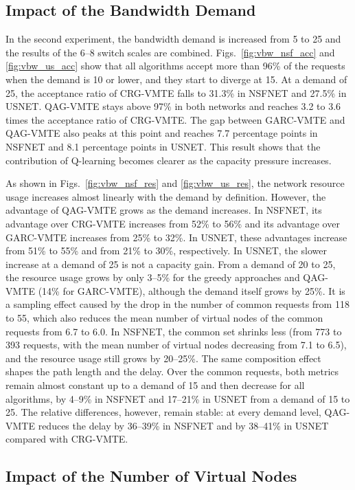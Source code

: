 \subsection{Impact of the Bandwidth Demand}
\label{subsec:vbw}

In the second experiment, the bandwidth demand is increased from 5 to 25 and the results of the 6--8 switch scales are combined. Figs.~\ref{fig:vbw_nsf_acc} and \ref{fig:vbw_us_acc} show that all algorithms accept more than 96\% of the requests when the demand is 10 or lower, and they start to diverge at 15. At a demand of 25, the acceptance ratio of CRG-VMTE falls to 31.3\% in NSFNET and 27.5\% in USNET. QAG-VMTE stays above 97\% in both networks and reaches 3.2 to 3.6 times the acceptance ratio of CRG-VMTE. The gap between GARC-VMTE and QAG-VMTE also peaks at this point and reaches 7.7 percentage points in NSFNET and 8.1 percentage points in USNET. This result shows that the contribution of Q-learning becomes clearer as the capacity pressure increases.

As shown in Figs.~\ref{fig:vbw_nsf_res} and \ref{fig:vbw_us_res}, the network resource usage increases almost linearly with the demand by definition. However, the advantage of QAG-VMTE grows as the demand increases. In NSFNET, its advantage over CRG-VMTE increases from 52\% to 56\% and its advantage over GARC-VMTE increases from 25\% to 32\%. In USNET, these advantages increase from 51\% to 55\% and from 21\% to 30\%, respectively. In USNET, the slower increase at a demand of 25 is not a capacity gain. From a demand of 20 to 25, the resource usage grows by only 3--5\% for the greedy approaches and QAG-VMTE (14\% for GARC-VMTE), although the demand itself grows by 25\%. It is a sampling effect caused by the drop in the number of common requests from 118 to 55, which also reduces the mean number of virtual nodes of the common requests from 6.7 to 6.0. In NSFNET, the common set shrinks less (from 773 to 393 requests, with the mean number of virtual nodes decreasing from 7.1 to 6.5), and the resource usage still grows by 20--25\%. The same composition effect shapes the path length and the delay. Over the common requests, both metrics remain almost constant up to a demand of 15 and then decrease for all algorithms, by 4--9\% in NSFNET and 17--21\% in USNET from a demand of 15 to 25. The relative differences, however, remain stable: at every demand level, QAG-VMTE reduces the delay by 36--39\% in NSFNET and by 38--41\% in USNET compared with CRG-VMTE.

\subsection{Impact of the Number of Virtual Nodes}
\label{subsec:vnode}

